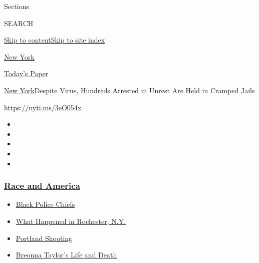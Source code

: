 Sections

SEARCH

\protect\hyperlink{site-content}{Skip to
content}\protect\hyperlink{site-index}{Skip to site index}

\href{https://www.nytimes3xbfgragh.onion/section/nyregion}{New York}

\href{https://myaccount.nytimes3xbfgragh.onion/auth/login?response_type=cookie\&client_id=vi}{}

\href{https://www.nytimes3xbfgragh.onion/section/todayspaper}{Today's
Paper}

\href{/section/nyregion}{New York}\textbar{}Despite Virus, Hundreds
Arrested in Unrest Are Held in Cramped Jails

\url{https://nyti.ms/3eO054x}

\begin{itemize}
\item
\item
\item
\item
\item
\end{itemize}

\hypertarget{race-and-america}{%
\subsubsection{\texorpdfstring{\href{https://www.nytimes3xbfgragh.onion/news-event/george-floyd-protests-minneapolis-new-york-los-angeles?name=styln-george-floyd\&region=TOP_BANNER\&block=storyline_menu_recirc\&action=click\&pgtype=Article\&impression_id=89952270-f4bd-11ea-ad23-071b6226df98\&variant=undefined}{Race
and America}}{Race and America}}\label{race-and-america}}

\begin{itemize}
\tightlist
\item
  \href{https://www.nytimes3xbfgragh.onion/2020/09/11/us/black-police-chiefs-reform.html?name=styln-george-floyd\&region=TOP_BANNER\&block=storyline_menu_recirc\&action=click\&pgtype=Article\&impression_id=89952271-f4bd-11ea-ad23-071b6226df98\&variant=undefined}{Black
  Police Chiefs}
\item
  \href{https://www.nytimes3xbfgragh.onion/2020/09/04/nyregion/rochester-police-daniel-prude.html?name=styln-george-floyd\&region=TOP_BANNER\&block=storyline_menu_recirc\&action=click\&pgtype=Article\&impression_id=89952272-f4bd-11ea-ad23-071b6226df98\&variant=undefined}{What
  Happened in Rochester, N.Y.}
\item
  \href{https://www.nytimes3xbfgragh.onion/2020/08/30/us/portland-shooting-explained.html?name=styln-george-floyd\&region=TOP_BANNER\&block=storyline_menu_recirc\&action=click\&pgtype=Article\&impression_id=89952273-f4bd-11ea-ad23-071b6226df98\&variant=undefined}{Portland
  Shooting}
\item
  \href{https://www.nytimes3xbfgragh.onion/2020/08/30/us/breonna-taylor-police-killing.html?name=styln-george-floyd\&region=TOP_BANNER\&block=storyline_menu_recirc\&action=click\&pgtype=Article\&impression_id=89954980-f4bd-11ea-ad23-071b6226df98\&variant=undefined}{Breonna
  Taylor's Life and Death}
\end{itemize}

